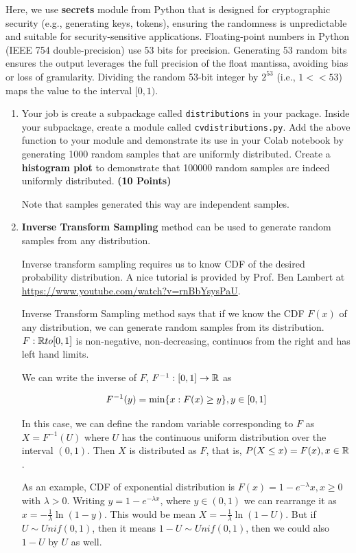 \documentclass[12pt, xcolor=dvipsnames,svgnames,x11names]{article}
\makeatletter
\newenvironment{multiequation}[1][]{%
\begin{equation}%
   \begin{aligned}%
   \ifx#1\@empty\else\label{#1}\fi%
}{%
   \end{aligned}%
\end{equation}%
}
\makeatother
\begin{document}
Here, we use \textbf{secrets} module from Python that is designed for cryptographic security (e.g., generating keys, tokens), ensuring the randomness is unpredictable and suitable for security-sensitive applications. Floating-point numbers in Python (IEEE 754 double-precision) use 53 bits for precision. Generating 53 random bits ensures the output leverages the full precision of the float mantissa, avoiding bias or loss of granularity. Dividing the random 53-bit integer by $2^{53}$ (i.e., $1 << 53$) maps the value to the interval $[0, 1)$.


\begin{enumerate}
\item Your job is create a subpackage called \texttt{distributions} in your package. Inside your subpackage, create a module called \texttt{cvdistributions.py}. Add the above function to your module and demonstrate its use in your Colab notebook by generating 1000 random samples that are uniformly distributed. Create a \textbf{histogram plot} to demonstrate that 100000 random samples are indeed uniformly distributed. \textbf{(10 Points)}

Note that samples generated this way are independent samples.

\item \textbf{Inverse Transform Sampling} method can be used to generate random samples from any distribution.

Inverse transform sampling requires us to know CDF of the desired probability distribution. A nice tutorial is provided by Prof. Ben Lambert at \url{https://www.youtube.com/watch?v=rnBbYsysPaU}.

Inverse Transform Sampling method says that if we know the CDF $F(x)$ of any distribution, we can generate random samples from its distribution. $F: {\mathbb R} to [0,1]$ is non-negative, non-decreasing, continuos from the right and has left hand limits. 

We can write the inverse of $F$, $F^{-1}: [0, 1] \to {\mathbb R}$ as 

\begin{multiequation}
F^{-1}(y) = \min\{x: F(x) \geq y \}, y \in [0, 1]
\end{multiequation}

In this case, we can define the random variable corresponding to $F$ as $X = F^{-1}(U)$ where $U$ has the continuous uniform distribution over the interval $(0,1)$. Then $X$ is distributed as $F$, that is, $P(X\leq x) = F(x), x\in {\mathbb R}$.

As an example, CDF of exponential distribution is $F(x) = 1-e^{-\lambda} x, x\geq 0$ with $\lambda >0$. Writing $y = 1 - e^{-\lambda  x}$, where $y\in (0, 1)$ we can rearrange it as $x = -\frac{1}{\lambda}\ln(1-y)$. This would be mean $X = -\frac{1}{\lambda}\ln(1-U)$. But if $U\sim Unif(0,1)$, then it means $1-U \sim Unif(0,1)$, then we could also $1-U$ by $U$ as well. 


\end{enumerate}
\end{document}
